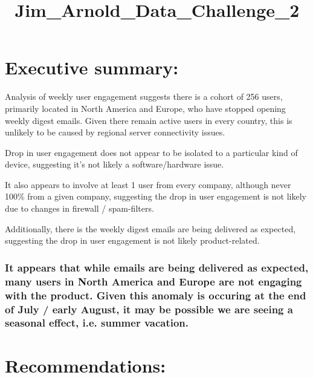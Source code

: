 \documentclass{report}
\title{Jim\_Arnold\_Data\_Challenge\_2}
\begin{document}
    
    
    
    \maketitle
    
    
    \tableofcontents


    
\chapter{Executive summary:}\label{executive-summary}

Analysis of weekly user engagement suggests there is a cohort of 256
users, primarily located in North America and Europe, who have stopped
opening weekly digest emails. Given there remain active users in every
country, this is unlikely to be caused by regional server connectivity
issues.

Drop in user engagement does not appear to be isolated to a particular
kind of device, suggesting it's not likely a software/hardware issue.

It also appears to involve at least 1 user from every company, although
never 100\% from a given company, suggesting the drop in user engagement
is not likely due to changes in firewall / spam-filters.

Additionally, there is the weekly digest emails are being delivered as
expected, suggesting the drop in user engagement is not likely
product-related.

\subsection{It appears that while emails are being delivered as
expected, many users in North America and Europe are not engaging with
the product. Given this anomaly is occuring at the end of July / early
August, it may be possible we are seeing a seasonal effect, i.e. summer
vacation.}\label{it-appears-that-while-emails-are-being-delivered-as-expected-many-users-in-north-america-and-europe-are-not-engaging-with-the-product.-given-this-anomaly-is-occuring-at-the-end-of-july-early-august-it-may-be-possible-we-are-seeing-a-seasonal-effect-i.e.-summer-vacation.}

\chapter{Recommendations:}\label{recommendations}
\end{document}
